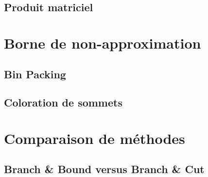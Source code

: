 \subsection{Produit matriciel}



%

\section{Borne de non-approximation}

\subsection{Bin Packing}


\subsection{Coloration de sommets}


\section{Comparaison de méthodes}

\subsection{Branch \& Bound versus Branch \& Cut}


\pagebreak
